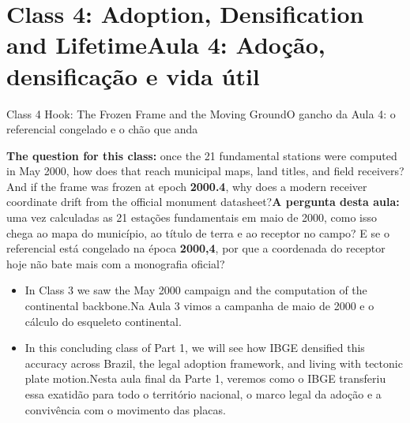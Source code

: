 \documentclass[aspectratio=169,11pt]{beamer}
\newcommand{\tr}[2]{\ifEN#2\else#1\fi}
\newcommand{\bnum}[1]{\ifmmode\textcolor{mTeal}{\mathbf{#1}}\else\textbf{\textcolor{mTeal}{#1}}\fi}
\begin{document}
\section{\tr{Aula 4: Adoção, densificação e vida útil}{Class 4: Adoption, Densification and Lifetime}}

\begin{frame}{\tr{O gancho da Aula 4: o referencial congelado e o chão que anda}{Class 4 Hook: The Frozen Frame and the Moving Ground}}
  \begin{ideia}
    \tr{\textbf{A pergunta desta aula:} uma vez calculadas as \num{21} estações fundamentais em maio
    de 2000, como isso chega ao mapa do município, ao título de terra e ao receptor no campo? E se o
    referencial está congelado na época \bnum{2000,4}, por que a coordenada do receptor hoje não bate
    mais com a monografia oficial?}{\textbf{The question for this class:} once the \num{21}
    fundamental stations were computed in May 2000, how does that reach municipal maps, land titles,
    and field receivers? And if the frame was frozen at epoch \bnum{2000.4}, why does a modern
    receiver coordinate drift from the official monument datasheet?}
  \end{ideia}
  \vspace{0.2cm}
  \begin{itemize}
    \setlength{\itemsep}{5pt}
    \item \tr{Na Aula 3 vimos a campanha de maio de 2000 e o cálculo do esqueleto continental.}{In
          Class 3 we saw the May 2000 campaign and the computation of the continental backbone.}
    \item \tr{Nesta aula final da Parte 1, veremos como o IBGE transferiu essa exatidão para todo o
          território nacional, o marco legal da adoção e a convivência com o movimento das placas.}{In
          this concluding class of Part 1, we will see how IBGE densified this accuracy across Brazil,
          the legal adoption framework, and living with tectonic plate motion.}
  \end{itemize}
\end{frame}
\end{document}

